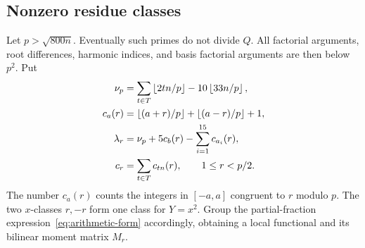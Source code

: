 \subsection{Nonzero residue classes}
Let $p>\sqrt{800n}$.  Eventually such primes do not divide $Q$.
All factorial arguments, root differences, harmonic indices, and
basis factorial arguments are then below $p^2$.  Put
\begin{align}
 \nu_p&=\sum_{t\in T}\left\lfloor2tn/p\right\rfloor-10\left\lfloor33n/p\right\rfloor,\label{eq:nu}\\
 c_a(r)&=\left\lfloor(a+r)/p\right\rfloor+\left\lfloor(a-r)/p\right\rfloor+1,\notag\\
 \lambda_r&=\nu_p+5c_b(r)-\sum_{i=1}^{15}c_{a_i}(r),\label{eq:lambda}\\
 c_r&=\sum_{t\in T}c_{tn}(r),\qquad 1\le r<p/2.\label{eq:capacity}
\end{align}
The number $c_a(r)$ counts the integers in $[-a,a]$ congruent to $r$
modulo $p$.  The two $x$-classes $r,-r$ form one class for $Y=x^2$.
Group the partial-fraction expression~\eqref{eq:arithmetic-form}
accordingly, obtaining a local functional and its bilinear moment
matrix $M_r$.

